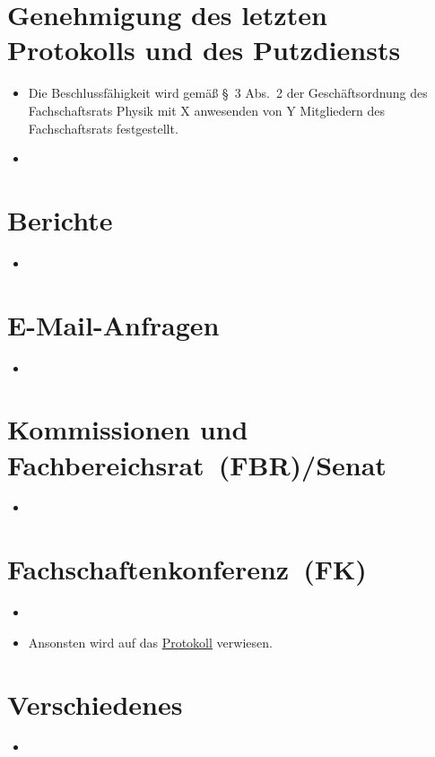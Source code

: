 \documentclass[sitzung=fsr]{fsphys-protokoll}
\begin{document}
\section{Genehmigung des letzten Protokolls und des Putzdiensts}
\begin{itemize}
	\item Die Beschlussfähigkeit wird gemäß \S~3 Abs.~2 der Geschäftsordnung des Fachschaftsrats Physik mit X anwesenden von Y Mitgliedern des Fachschaftsrats festgestellt.
	\item 
\end{itemize}

\section{Berichte}
\begin{itemize}
	\item 
\end{itemize}

\section{E-Mail-Anfragen}
\begin{itemize}
	\item 
\end{itemize}

\section{Kommissionen und Fachbereichsrat~(FBR)/Senat}
\begin{itemize}
	\item 
\end{itemize}

\section{Fachschaftenkonferenz~(FK)}
\begin{itemize}
	\item 
	\item Ansonsten wird auf das \href{http://www.asta.ms/hochschulpolitik/hochschulpolitik/fachschaften/fk-protokolle}{Protokoll} verwiesen.
\end{itemize}

\section{Verschiedenes}
\begin{itemize}
	\item 
\end{itemize}
\end{document}
